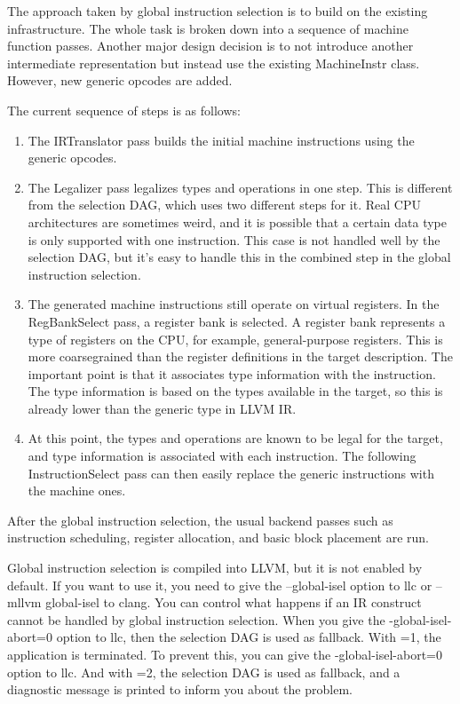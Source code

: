 The approach taken by global instruction selection is to build on the existing infrastructure. The whole task is broken down into a sequence of machine function passes. Another major design decision is to not introduce another intermediate representation but instead use the existing MachineInstr class. However, new generic opcodes are added.\par

The current sequence of steps is as follows:\par

\begin{enumerate}
\item The IRTranslator pass builds the initial machine instructions using the generic opcodes.

\item The Legalizer pass legalizes types and operations in one step. This is different from the selection DAG, which uses two different steps for it. Real CPU architectures are sometimes weird, and it is possible that a certain data type is only supported with one instruction. This case is not handled well by the selection DAG, but it's easy to handle this in the combined step in the global instruction selection.

\item The generated machine instructions still operate on virtual registers. In the RegBankSelect pass, a register bank is selected. A register bank represents a type of registers on the CPU, for example, general-purpose registers. This is more coarsegrained than the register definitions in the target description. The important point is that it associates type information with the instruction. The type information is based on the types available in the target, so this is already lower than the generic type in LLVM IR.

\item At this point, the types and operations are known to be legal for the target, and type information is associated with each instruction. The following InstructionSelect pass can then easily replace the generic instructions with the machine ones.
\end{enumerate}

After the global instruction selection, the usual backend passes such as instruction scheduling, register allocation, and basic block placement are run.\par

Global instruction selection is compiled into LLVM, but it is not enabled by default. If you want to use it, you need to give the –global-isel option to llc or –mllvm global-isel to clang. You can control what happens if an IR construct cannot be handled by global instruction selection. When you give the -global-isel-abort=0 option to llc, then the selection DAG is used as fallback. With =1, the application is terminated. To prevent this, you can give the -global-isel-abort=0 option to llc. And with =2, the selection DAG is used as fallback, and a diagnostic message is printed to inform you about the problem.\par

